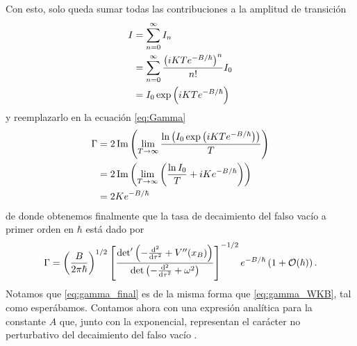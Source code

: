 Con esto, solo queda sumar todas las contribuciones a la amplitud de transición
\begin{align}
	I &= \sum_{n = 0}^{\infty} I_n \\
	&= \sum_{n = 0}^{\infty} \frac{\left(iKTe^{-B/\hbar}\right)^n}{n!} I_0 \\
	&= I_0 \exp\qty(iKTe^{-B/\hbar})
\end{align}
y reemplazarlo en la ecuación \eqref{eq:Gamma}
\begin{align}
	\Gamma &= 2\Im\qty(\lim_{T \rightarrow \infty} \frac{ \ln \qty(I_0 \exp\qty(iKTe^{-B/\hbar}))}{T}) \\
	&= 2 \Im \qty(\lim_{T \rightarrow \infty} \qty( \frac{\ln I_0}{T} + iKe^{-B/\hbar})) \\
	&= 2 Ke^{-B/\hbar}
\end{align}
de donde obtenemos finalmente que la tasa de decaimiento del falso vacío a primer orden en $\hbar$ está dado por
\begin{equation} \label{eq:gamma_final}
\Gamma = \left(\frac{B}{2\pi\hbar}\right)^{1/2}  \left[ \frac{\textrm{det}' \left(-\dv[2]{}{\tau} + V''(x_B) \right)}{\det \left(-\dv[2]{}{\tau} + \omega^2 \right)} \right]^{-1/2}e^{-B/\hbar}\left( 1 + \mathcal{O}(\hbar)\right).
\end{equation}
Notamos que \eqref{eq:gamma_final} es de la misma forma que \eqref{eq:gamma_WKB}, tal como esperábamos. Contamos ahora con una expresión analítica para la constante $A$ que, junto con la exponencial, representan el carácter no perturbativo del decaimiento del falso vacío \cite{weinberg2012classical}.  



